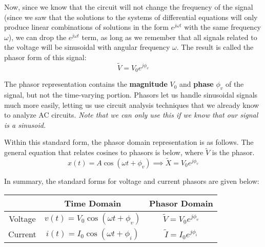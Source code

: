 Now, since we know that the circuit will not change the frequency of the signal (since we saw that the solutions to the systems of differential equations will only produce linear combinations of solutions in the form $e^{j\omega t}$ with the same frequency $\omega$), we can drop the $e^{j\omega t}$ term, as long as we remember that all signals related to the voltage will be sinusoidal with angular frequency $\omega$.
The result is called the phasor form of this signal:
\[\boxed{\widetilde{V}=V_0e^{j\phi_v}}\]

The phasor representation contains the \textbf{magnitude} $V_0$ and \textbf{phase} $\phi_v$ of the signal, but not the time-varying portion. Phasors let us handle sinusoidal signals much more easily, letting us use circuit analysis techniques that we already know to analyze AC circuits. \textit{Note that we can only use this if we know that our signal is a sinusoid.}

Within this standard form, the phasor domain representation is as follows. The general equation that relates cosines to phasors is below, where $\widetilde{V}$ is the phasor.
\[x(t) = A \cos(\omega t + \phi_v) \implies \widetilde{X} =  V_0e^{j\phi_v} \]

In summary, the standard forms for voltage and current phasors are given below:
\begin{center} \begin{tabular}{|c|c|c|}
\hline
        & Time Domain                         & Phasor Domain \\ \hline
Voltage & $v(t) = V_0 \cos(\omega t + \phi_v)$ & $\widetilde{V} = V_0 e^{j\phi_v}$ \\ %
Current & $i(t) = I_0 \cos(\omega t + \phi_i)$ & $\widetilde{I} = I_0 e^{j\phi_i}$ \\%
\hline
\end{tabular} \end{center}

